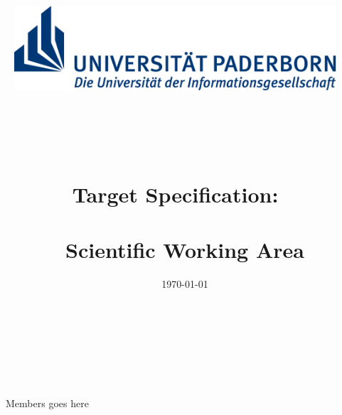 \documentclass[12pt,twoside,doublepage]{article}
\title{
	\includegraphics[width=12cm]{figures/uni-logo}
	\ \\ \ \\
	\ \\ \ \\
	Target Specification: 
	 \ \\ \ \\ Scientific Working Area}
\author{\projecttitle}
\date{}
\begin{document}
	
\maketitle
\ \\ \ \\
\ \\ \ \\

\begin{sloppypar}
	\centering \LARGE Members goes here	\ \\ \ \\  \begin{large} \date{\today} \end{large}	 
\end{sloppypar}

\thispagestyle{empty}
\clearpage
\tableofcontents
\thispagestyle{empty}
\clearpage




\begin{acronym}[somethinglonger]
\end{acronym}
	\clearpage 








\end{document}
